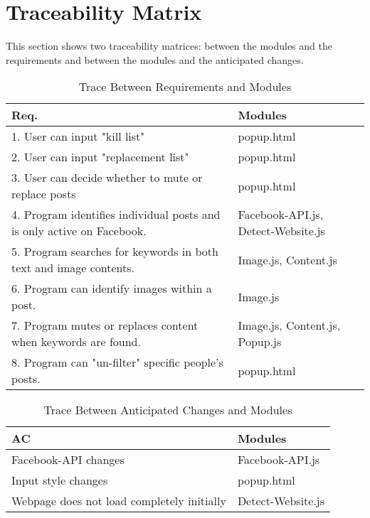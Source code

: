 \documentclass[12pt, titlepage]{article}
\begin{document}
\section{Traceability Matrix} \label{SecTM}
This section shows two traceability matrices: between the modules and the
requirements and between the modules and the anticipated changes.
\begin{table}[H]
\centering
\begin{tabular}{p{} p{}}
\toprule
\textbf{Req.} & \textbf{Modules}\\
\midrule
1. User can input "kill list" &  popup.html\\
2. User can input "replacement list" &  popup.html\\
3. User can decide whether to mute or replace posts &  popup.html\\
4. Program identifies individual posts and is only active on Facebook. &  Facebook-API.js, Detect-Website.js\\ 
5. Program searches for keywords in both text and image contents.  &  Image.js, Content.js\\
6. Program can identify images within a post. &  Image.js\\
7. Program mutes or replaces content when keywords are found. &  Image.js, Content.js, Popup.js\\
8. Program can "un-filter" specific people's posts. &  popup.html\\
\bottomrule
\end{tabular}
\caption{Trace Between Requirements and Modules}
\label{TblRT}
\end{table}
\begin{table}[H]
\centering
\begin{tabular}{p{} p{}}
\toprule
\textbf{AC} & \textbf{Modules}\\
\midrule
Facebook-API changes & Facebook-API.js\\
Input style changes & popup.html\\
Webpage does not load completely initially & Detect-Website.js\\
\bottomrule
\end{tabular}
\caption{Trace Between Anticipated Changes and Modules}
\label{TblACT}
\end{table}
\end{document}
